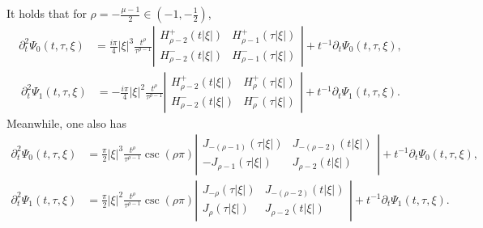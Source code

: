 \documentclass[10pt,a4paper]{amsart}
\newcommand{\f}{\frac}
\newcommand{\p}{\partial}
\begin{document}
\begin{lemma}\label{lem6}
It holds that for $\rho=-\f{\mu-1}{2}\in (-1, -\f12)$,
\begin{equation}\label{l-1}
\begin{aligned}
\p_t^2\Psi_{0}(t, \tau, \xi)& =\frac{i \pi}{4}|\xi|^3 \frac{t^{\rho}}{\tau^{\rho-1}}\left|\begin{array}{ll}
H_{\rho-2}^{+}(t|\xi|) & H_{\rho-1}^{+}(\tau|\xi|) \\
H_{\rho-2}^{-}(t|\xi|) & H_{\rho-1}^{-}(\tau|\xi|)
\end{array}\right|+ t^{-1}\p_t\Psi_{0}(t, \tau, \xi),
\end{aligned}
\end{equation}
\begin{equation}\label{l-2}
\begin{aligned}
\p_t^2\Psi_{1}(t, \tau, \xi)& =-\frac{i \pi}{4}|\xi|^2 \frac{t^{\rho}}{\tau^{\rho-1}}\left|\begin{array}{ll}
H_{\rho-2}^{+}(t|\xi|) & H_{\rho}^{+}(\tau|\xi|) \\
H_{\rho-2}^{-}(t|\xi|) & H_{\rho}^{-}(\tau|\xi|)
\end{array}\right|+ t^{-1}\p_t\Psi_{1}(t, \tau, \xi).
\end{aligned}
\end{equation}
Meanwhile, one also has
\begin{equation}\label{l-3}
\begin{aligned}
\p_t^2\Psi_{0}(t, \tau, \xi)
& =\frac{\pi}{2}|\xi|^3 \frac{t^{\rho}}{\tau^{\rho-1}}\csc(\rho\pi)\left|\begin{array}{ll}
J_{-(\rho-1)}(\tau|\xi|) & J_{-(\rho-2)}(t|\xi|) \\
-J_{\rho-1}(\tau|\xi|) & J_{\rho-2}(t|\xi|)
\end{array}\right|+ t^{-1}\p_t\Psi_{0}(t, \tau, \xi),
\end{aligned}
\end{equation}
\begin{equation}\label{l-4}
\begin{aligned}
\p_t^2\Psi_{1}(t, \tau, \xi)
& =\frac{ \pi}{2}|\xi|^2 \frac{t^{\rho}}{\tau^{\rho-1}}\csc(\rho\pi)\left|\begin{array}{ll}
J_{-\rho}(\tau|\xi|) & J_{-(\rho-2)}(t|\xi|) \\
J_{\rho}(\tau|\xi|) & J_{\rho-2}(t|\xi|)
\end{array}\right|+ t^{-1}\p_t\Psi_{1}(t, \tau, \xi).
\end{aligned}
\end{equation}
\end{lemma}
\end{document}

